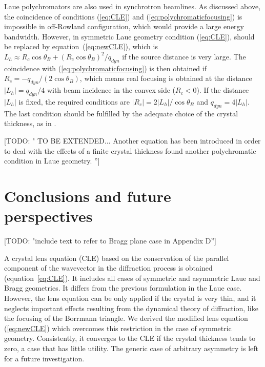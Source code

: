 \documentclass[preprint]{iucr}              %
\newcommand{\todo}[1]{{\color{red}[TODO: "#1'']}}
\newcommand{\inred}[1]{{\color{red}#1}}
\begin{document}
Laue polychromators are also used in synchrotron beamlines.
As discussed \inred{above}, \inred{the coincidence of
conditions (\ref{eq:CLE}) and (\ref{eq:polychromaticfocusing}) is impossible in off-Rowland configuration, which would provide} a large energy bandwidth. 
However, \inred{in symmetric Laue geometry condition (\ref{eq:CLE}), should be replaced by equation~(\ref{eq:newCLE}), which is $L_h \approx R_c \cos\theta_B + (R_c \cos\theta_B) ^2 / q_{dyn}$ if the source distance is very large.} 
The coincidence \inred{with (\ref{eq:polychromaticfocusing}) is then obtained} if
$R_c=-q_{dyn}/(2\cos\theta_B)$,
\inred{which means} real focusing \inred{is obtained} at the distance $|L_h|=q_{dyn}/4$ with beam incidence in the  convex side ($R_c<0$). 
\inred{If the distance $|L_h|$ is fixed, the required conditions are $|R_c| = 2 |L_h| / \cos\theta_B$ and $q_{dyn}=4|L_h|$. The last condition should be fulfilled by the adequate choice of} the crystal thickness, as in  \cite{Mocella2004,Mocella2008}.


% 
\todo{ TO BE EXTENDED... Another equation has been introduced in order to deal with the effects of a finite crystal thickness \cite{Martinson, PengQi, PengQi2021} found another polychromatic condition in Laue geometry. }


\section{Conclusions \inred{and future perspectives}}
\label{sec:summary}

\todo{include text to refer to Bragg plane case in Appendix D}

A crystal lens equation (CLE) based on the conservation of the parallel component of the wavevector in the diffraction process is obtained (equation~\ref{eq:CLE}). It includes all cases of symmetric and asymmetric Laue and Bragg geometries. It differs from the previous formulation \cite{CK} in the Laue case. However, the lens equation 
can be only applied if the crystal is very thin, and it neglects important effects resulting from the dynamical theory of diffraction, like the focusing of the Borrmann triangle. We derived the modified lens equation (\ref{eq:newCLE}) which overcomes this restriction \inred{in the case of symmetric geometry}. Consistently, it converges to the CLE if the crystal thickness \inred{tends to zero}, a case that has little utility. The generic case of arbitrary asymmetry is left for a future investigation.
\end{document}
